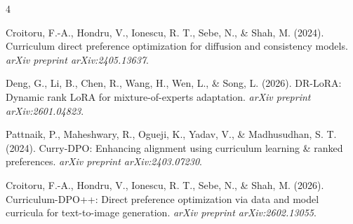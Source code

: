 \documentclass{article}
\begin{document}
\begin{thebibliography}{4}

Croitoru, F.-A., Hondru, V., Ionescu, R. T., Sebe, N., \& Shah, M. (2024). Curriculum direct preference optimization for diffusion and consistency models. {\it arXiv preprint arXiv:2405.13637}.

Deng, G., Li, B., Chen, R., Wang, H., Wen, L., \& Song, L. (2026). DR-LoRA: Dynamic rank LoRA for mixture-of-experts adaptation. {\it arXiv preprint arXiv:2601.04823}.

Pattnaik, P., Maheshwary, R., Ogueji, K., Yadav, V., \& Madhusudhan, S. T. (2024). Curry-DPO: Enhancing alignment using curriculum learning \& ranked preferences. {\it arXiv preprint arXiv:2403.07230}.

Croitoru, F.-A., Hondru, V., Ionescu, R. T., Sebe, N., \& Shah, M. (2026). Curriculum-DPO++: Direct preference optimization via data and model curricula for text-to-image generation. {\it arXiv preprint arXiv:2602.13055}.








\end{thebibliography}
\end{document}
